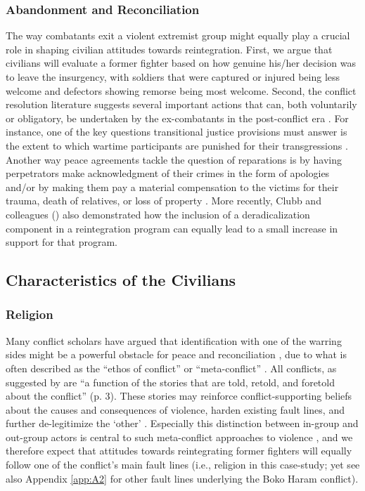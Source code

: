 \subsubsection{Abandonment and Reconciliation}
The way combatants exit a violent extremist group might equally play a crucial role in shaping civilian attitudes towards reintegration. First, we argue that civilians will evaluate a former fighter based on how genuine his/her decision was to leave the insurgency, with soldiers that were captured or injured being less welcome and defectors showing remorse being most welcome. Second, the conflict resolution literature suggests several important actions that can, both voluntarily or obligatory, be undertaken by the ex-combatants in the post-conflict era \citep{Tellez2019a}. For instance, one of the key questions transitional justice provisions must answer is the extent to which wartime participants are punished for their transgressions \citep[i.e., retributive justice;][]{Wenzel2016}. Another way peace agreements tackle the question of reparations is by having perpetrators make acknowledgment of their crimes in the form of apologies \citep[i.e., restorative justice;][]{Strang2001} and/or by making them pay a material compensation to the victims for their trauma, death of relatives, or loss of property \citep[i.e., distributive justice;][]{Gibson2002}. More recently, Clubb and colleagues (\citeyear{Clubb2019}) also demonstrated how the inclusion of a deradicalization component in a reintegration program can equally lead to a small increase in support for that program.


\subsection{Characteristics of the Civilians}
\subsubsection{Religion}
Many conflict scholars have argued that identification with one of the warring sides might be a powerful obstacle for peace and reconciliation \citep{Samii2013b, Dyrstad2019, Tellez2019b}, due to what is often described as the ``ethos of conflict'' \citep{Bar-Tal2012} or ``meta-conflict'' \citep{Hearty2016}. All conflicts, as suggested by \cite{Cobb2013} are ``a function of the stories that are told, retold, and foretold about the conflict'' (p. 3). These stories may reinforce conflict-supporting beliefs about the causes and consequences of violence, harden existing fault lines, and further de-legitimize the `other' \citep{Bar-Tal2012}. Especially this distinction between in-group and out-group actors is central to such meta-conflict approaches to violence \citep{Tenenboim-Weinblatt2016}, and we therefore expect that attitudes towards reintegrating former fighters will equally follow one of the conflict's main fault lines (i.e., religion in this case-study; yet see also Appendix \ref{app:A2} for other fault lines underlying the Boko Haram conflict).

